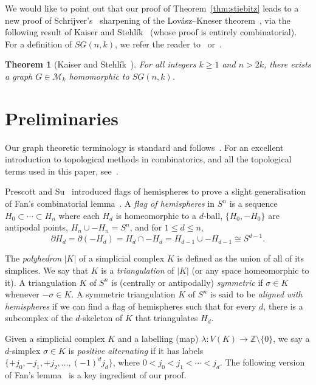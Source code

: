 \documentclass[11pt,a4paper]{amsart}
\newtheorem{theorem}{Theorem}[section]
\begin{document}
We would like to point out that our proof of Theorem~\ref{thm:stiebitz}
leads to a new proof of Schrijver's~\cite{Sch78} sharpening of the Lov\'asz--Kneser
theorem~\cite{Lov78}, via the following result of Kaiser and Stehl\'ik~\cite{KS15}
(whose proof is entirely combinatorial). For a definition of $SG(n,k)$, we refer
the reader to~\cite{KS15} or~\cite{Mat03}.

\begin{theorem}[Kaiser and Stehl\'ik~\cite{KS15}]
  For all integers $k \geq 1$ and $n > 2k$, there exists a graph $G \in \mathcal M_k$
  homomorphic to $SG(n,k)$.
\end{theorem}

\section{Preliminaries}

Our graph theoretic terminology is standard and follows~\cite{BM08}.
For an excellent introduction to topological methods in combinatorics, and all the
topological terms used in this paper, see~\cite{Mat03}.

Prescott and Su~\cite{PS05} introduced flags of hemispheres to prove a slight generalisation
of Fan's combinatorial lemma~\cite{Fan52}. 
A \emph{flag of hemispheres} in $S^n$ is a sequence $H_0 \subset \cdots \subset H_n$
where each $H_d$ is homeomorphic to a $d$-ball, $\{H_0,-H_0\}$ are antipodal points,
$H_n \cup -H_n = S^n$, and for $1 \leq d \leq n$,
\[
  \partial H_d = \partial(-H_d) = H_d \cap -H_d = H_{d-1}\cup -H_{d-1} \cong S^{d-1}.
\]

The \emph{polyhedron} $|K|$ of a simplicial complex $K$ is defined as the union of all
of its simplices. We say that $K$ is a \emph{triangulation} of $|K|$ (or any space
homeomorphic to it).
A triangulation $K$ of $S^n$ is (centrally or antipodally) \emph{symmetric} if $\sigma \in K$ whenever
$-\sigma \in K$. A symmetric triangulation $K$ of $S^n$ is said to be \emph{aligned with
hemispheres} if we can find a flag of hemispheres such that for every $d$,
there is a subcomplex of the $d$-skeleton of $K$ that triangulates $H_d$.

Given a simplicial complex $K$ and a labelling (map)
$\lambda : V(K) \to {\mathbb Z}\setminus \{0\}$, we say a 
$d$-simplex $\sigma \in K$ is \emph{positive alternating} if it has labels
$\{+j_0,-j_1,+j_2, \ldots, (-1)^dj_d\}$, where $0<j_0<j_1< \cdots <j_d$.
The following version of Fan's lemma~\cite{Fan52} is a key ingredient of our proof.
\end{document}
